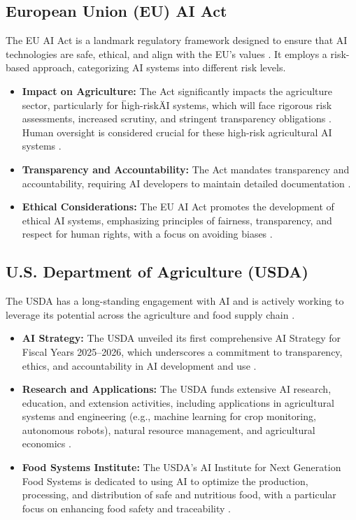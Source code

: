 \subsection{European Union (EU) AI Act}
The EU AI Act is a landmark regulatory framework designed to ensure that AI technologies are safe, ethical, and align with the EU's values \cite{BablAI_EU_AI_Act}. It employs a risk-based approach, categorizing AI systems into different risk levels.
\begin{itemize}
    \item \textbf{Impact on Agriculture:} The Act significantly impacts the agriculture sector, particularly for \"high-risk\" AI systems, which will face rigorous risk assessments, increased scrutiny, and stringent transparency obligations \cite{IFA_EU_AI_Act}. Human oversight is considered crucial for these high-risk agricultural AI systems \cite{BablAI_EU_AI_Act}.
    \item \textbf{Transparency and Accountability:} The Act mandates transparency and accountability, requiring AI developers to maintain detailed documentation \cite{FoodIngredientsFirst_EU_AI_Act}.
    \item \textbf{Ethical Considerations:} The EU AI Act promotes the development of ethical AI systems, emphasizing principles of fairness, transparency, and respect for human rights, with a focus on avoiding biases \cite{SustainabilityDirectory_EU_AI_Act}.
\end{itemize}

\subsection{U.S. Department of Agriculture (USDA)}
The USDA has a long-standing engagement with AI and is actively working to leverage its potential across the agriculture and food supply chain \cite{USDA_AI_Strategy}.
\begin{itemize}
    \item \textbf{AI Strategy:} The USDA unveiled its first comprehensive AI Strategy for Fiscal Years 2025–2026, which underscores a commitment to transparency, ethics, and accountability in AI development and use \cite{USDA_AI_Strategy_2}.
    \item \textbf{Research and Applications:} The USDA funds extensive AI research, education, and extension activities, including applications in agricultural systems and engineering (e.g., machine learning for crop monitoring, autonomous robots), natural resource management, and agricultural economics \cite{USDA_AI_Strategy}.
    \item \textbf{Food Systems Institute:} The USDA's AI Institute for Next Generation Food Systems is dedicated to using AI to optimize the production, processing, and distribution of safe and nutritious food, with a particular focus on enhancing food safety and traceability \cite{USDA_AI_Institute}.
\end{itemize}

